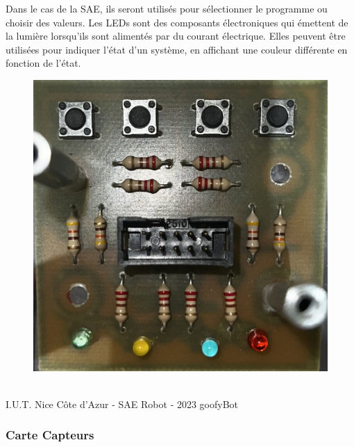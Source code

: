 Dans le cas de la SAE, ils seront utilisés pour sélectionner le programme ou choisir des valeurs.
Les LEDs sont des composants électroniques qui émettent de la lumière lorsqu'ils sont alimentés par du courant électrique. Elles peuvent être utilisées pour indiquer l'état d'un système, en affichant une couleur différente en fonction de l'état.

\begin{figure}[H]
\centering
\begin{minipage}{.5\textwidth}
  \centering
  \centerline{\includegraphics[width=1\linewidth]{img/cartes/ihm.jpeg}}
  \label{fig:ihm}
\end{minipage}%
\end{figure}

\vfill
\noindent\makebox[\linewidth]{\rule{.8\paperwidth}{.6pt}}\\[0.2cm]
I.U.T. Nice Côte d'Azur - SAE Robot - 2023 \hfill goofyBot
\noindent\makebox[\linewidth]{\rule{.8\paperwidth}{.6pt}}
\newpage




\subsubsection{Carte Capteurs}

